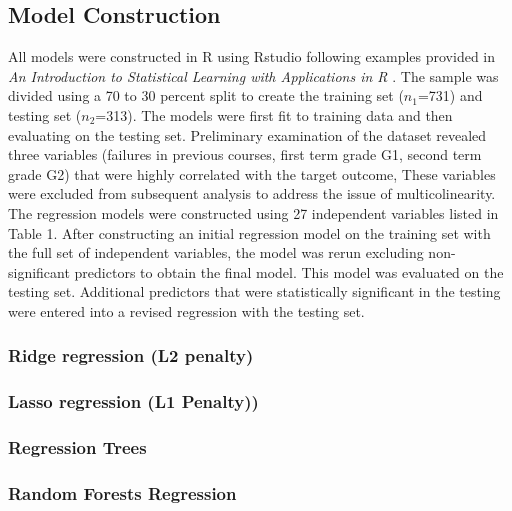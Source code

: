 \documentclass[sigconf]{acmart}
\begin{document}

\subsection{Model Construction}

All models were constructed in R using Rstudio following examples provided 
in \emph{An Introduction to Statistical Learning with Applications in R} 
\cite{jamesetal13}. The sample was divided using a 70 to 30 percent split to 
create the training set ($n_1$=731) and testing set ($n_2$=313). The models
were first fit to training data and then evaluating on the testing set. 
Preliminary examination of the dataset revealed three variables (failures in 
previous courses, first term grade G1, second term grade G2) that were highly 
correlated with the target outcome, These variables were excluded from 
subsequent analysis to address the issue of multicolinearity. The regression 
models were constructed using 27 independent variables listed in Table 1. 
After constructing an initial regression model on the training set with the
full set of independent variables, the model was rerun excluding non-
significant predictors to obtain the final model. This model was evaluated
on the testing set. Additional predictors that were statistically significant 
in the testing were entered into a revised regression with the testing set. 


\subsubsection{Ridge regression (L2 penalty)} 



\subsubsection{Lasso regression (L1 Penalty))} 
 


\subsubsection{Regression Trees} 



\subsubsection{Random Forests Regression} 
\end{document}
